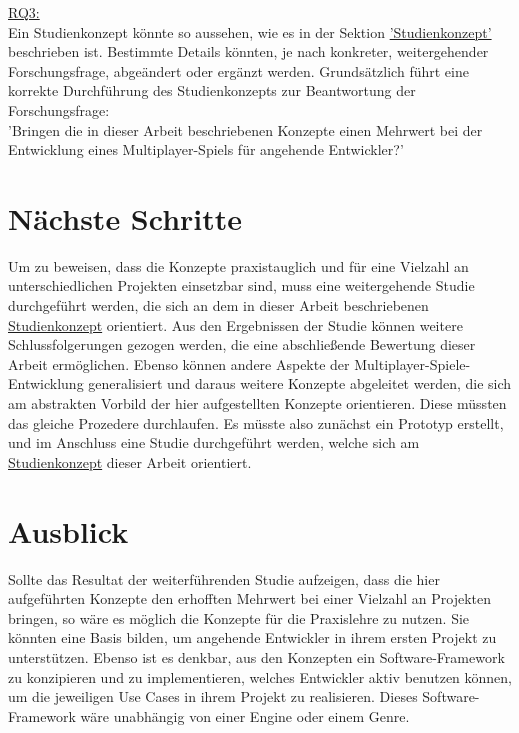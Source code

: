 \hyperref[RQ3]{RQ3:} \\
Ein Studienkonzept könnte so aussehen, wie es in der Sektion \hyperref[studienkonzept]{'Studienkonzept'} beschrieben ist. Bestimmte Details könnten, je nach konkreter, weitergehender Forschungsfrage, abgeändert oder ergänzt werden. Grundsätzlich führt eine korrekte Durchführung des Studienkonzepts zur Beantwortung der Forschungsfrage: \\
'Bringen die in dieser Arbeit beschriebenen Konzepte einen Mehrwert bei der Entwicklung eines Multiplayer-Spiels für angehende Entwickler?'

\section{Nächste Schritte}

Um zu beweisen, dass die Konzepte praxistauglich und für eine Vielzahl an unterschiedlichen Projekten einsetzbar sind, muss eine weitergehende Studie durchgeführt werden, die sich an dem in dieser Arbeit beschriebenen \hyperref[studienkonzept]{Studienkonzept} orientiert. Aus den Ergebnissen der Studie können weitere Schlussfolgerungen gezogen werden, die eine abschließende Bewertung dieser Arbeit ermöglichen. Ebenso können andere Aspekte der Multiplayer-Spiele-Entwicklung generalisiert und daraus weitere Konzepte abgeleitet werden, die sich am abstrakten Vorbild der hier aufgestellten Konzepte orientieren. Diese müssten das gleiche Prozedere durchlaufen. Es müsste also zunächst ein Prototyp erstellt, und im Anschluss eine Studie durchgeführt werden, welche sich am \hyperref[studienkonzept]{Studienkonzept} dieser Arbeit orientiert.

\section{Ausblick}

Sollte das Resultat der weiterführenden Studie aufzeigen, dass die hier aufgeführten Konzepte den erhofften Mehrwert bei einer Vielzahl an Projekten bringen, so wäre es möglich die Konzepte für die Praxislehre zu nutzen. Sie könnten eine Basis bilden, um angehende Entwickler in ihrem ersten Projekt zu unterstützen. Ebenso ist es denkbar, aus den Konzepten ein Software-Framework zu konzipieren und zu implementieren, welches Entwickler aktiv benutzen können, um die jeweiligen Use Cases in ihrem Projekt zu realisieren. Dieses Software-Framework wäre unabhängig von einer Engine oder einem Genre.